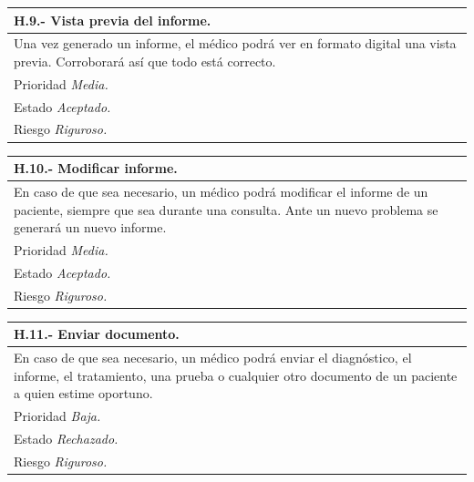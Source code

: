 \documentclass[a4paper,oneside,11pt]{book}
\begin{document}
\begin{center}
\begin{tabulary}{15cm}{|L|}
	\hline
		\bf{H.9.- Vista previa del informe.} \\
	\hline
		Una vez generado un informe, el médico podrá ver en formato digital una vista previa. Corroborará así que todo está correcto. \\
	\hline
		Prioridad \textit{Media.} \\
	\hline
		Estado \textit{Aceptado.} \\
	\hline
		Riesgo \textit{Riguroso.} \\
	\hline
\end{tabulary}
\end{center}

\begin{center}
\begin{tabulary}{15cm}{|L|}
	\hline
		\bf{H.10.- Modificar informe.} \\
	\hline
		En caso de que sea necesario, un médico podrá modificar el informe de un paciente, siempre que sea durante una consulta. Ante un nuevo problema se generará un nuevo informe.\\
	\hline
		Prioridad \textit{Media.} \\
	\hline
		Estado \textit{Aceptado.} \\
	\hline
		Riesgo \textit{Riguroso.} \\
	\hline
\end{tabulary}
\end{center}

\begin{center}
\begin{tabulary}{15cm}{|L|}
	\hline
		\bf{H.11.- Enviar documento.} \\
	\hline
		En caso de que sea necesario, un médico podrá enviar el diagnóstico, el informe, el tratamiento, una prueba o cualquier otro documento de un paciente a quien estime oportuno. \\
	\hline
		Prioridad \textit{Baja.} \\
	\hline
		Estado \textit{Rechazado.} \\
	\hline
		Riesgo \textit{Riguroso.} \\
	\hline
\end{tabulary}
\end{center}
\end{document}
